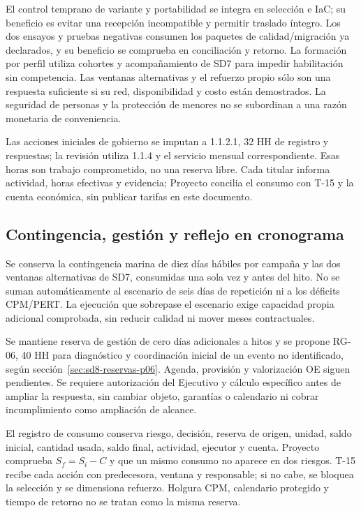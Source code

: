 El control temprano de variante y portabilidad se integra en selección e IaC; su beneficio es evitar una recepción incompatible y permitir traslado íntegro. Los dos ensayos y pruebas negativas consumen los paquetes de calidad/migración ya declarados, y su beneficio se comprueba en conciliación y retorno. La formación por perfil utiliza cohortes y acompañamiento de SD7 para impedir habilitación sin competencia. Las ventanas alternativas y el refuerzo propio sólo son una respuesta suficiente si su red, disponibilidad y costo están demostrados. La seguridad de personas y la protección de menores no se subordinan a una razón monetaria de conveniencia.

Las acciones iniciales de gobierno se imputan a 1.1.2.1, 32 HH de registro y respuestas; la revisión utiliza 1.1.4 y el servicio mensual correspondiente. Esas horas son trabajo comprometido, no una reserva libre. Cada titular informa actividad, horas efectivas y evidencia; Proyecto concilia el consumo con T-15 y la cuenta económica, sin publicar tarifas en este documento.

\subsection{Contingencia, gestión y reflejo en cronograma}
Se conserva la contingencia marina de diez días hábiles por campaña y las dos ventanas alternativas de SD7, consumidas una sola vez y antes del hito. No se suman automáticamente al escenario de seis días de repetición ni a los déficits CPM/PERT. La ejecución que sobrepase el escenario exige capacidad propia adicional comprobada, sin reducir calidad ni mover meses contractuales.

Se mantiene reserva de gestión de cero días adicionales a hitos y se propone RG-06, 40 HH para diagnóstico y coordinación inicial de un evento no identificado, según sección~\ref{sec:sd8-reservas-p06}. Agenda, provisión y valorización OE siguen pendientes. Se requiere autorización del Ejecutivo y cálculo específico antes de ampliar la respuesta, sin cambiar objeto, garantías o calendario ni cobrar incumplimiento como ampliación de alcance. \parencite[art.~72, p.~38]{sd8-ba}

El registro de consumo conserva riesgo, decisión, reserva de origen, unidad, saldo inicial, cantidad usada, saldo final, actividad, ejecutor y cuenta. Proyecto comprueba $S_f=S_i-C$ y que un mismo consumo no aparece en dos riesgos. T-15 recibe cada acción con predecesora, ventana y responsable; si no cabe, se bloquea la selección y se dimensiona refuerzo. Holgura CPM, calendario protegido y tiempo de retorno no se tratan como la misma reserva.

